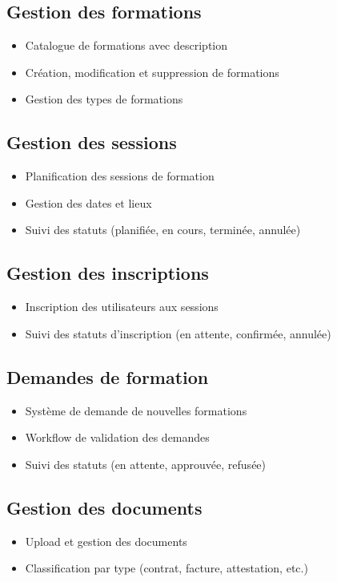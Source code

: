 \documentclass[a4paper,12pt]{article}
\begin{document}
\subsection{Gestion des formations}
\begin{itemize}
    \item Catalogue de formations avec description
    \item Création, modification et suppression de formations
    \item Gestion des types de formations
\end{itemize}

\subsection{Gestion des sessions}
\begin{itemize}
    \item Planification des sessions de formation
    \item Gestion des dates et lieux
    \item Suivi des statuts (planifiée, en cours, terminée, annulée)
\end{itemize}

\subsection{Gestion des inscriptions}
\begin{itemize}
    \item Inscription des utilisateurs aux sessions
    \item Suivi des statuts d'inscription (en attente, confirmée, annulée)
\end{itemize}

\subsection{Demandes de formation}
\begin{itemize}
    \item Système de demande de nouvelles formations
    \item Workflow de validation des demandes
    \item Suivi des statuts (en attente, approuvée, refusée)
\end{itemize}

\subsection{Gestion des documents}
\begin{itemize}
    \item Upload et gestion des documents
    \item Classification par type (contrat, facture, attestation, etc.)
\end{itemize}
\end{document}
